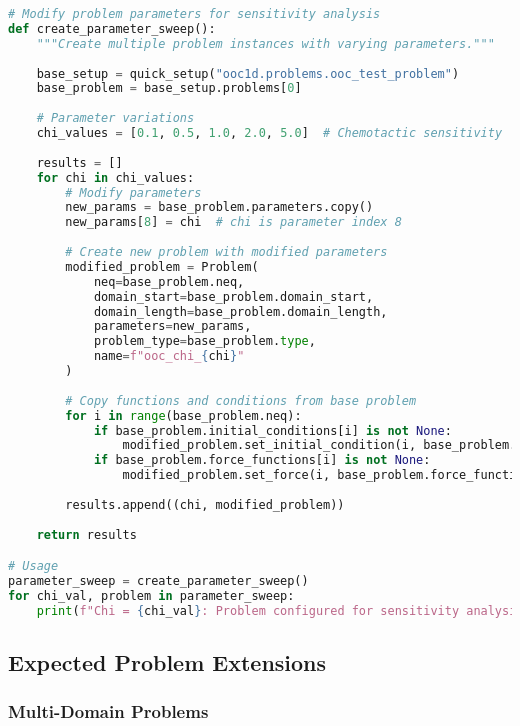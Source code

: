 \begin{lstlisting}[language=Python, caption=Parameter Sensitivity Example]
# Modify problem parameters for sensitivity analysis
def create_parameter_sweep():
    """Create multiple problem instances with varying parameters."""
    
    base_setup = quick_setup("ooc1d.problems.ooc_test_problem")
    base_problem = base_setup.problems[0]
    
    # Parameter variations
    chi_values = [0.1, 0.5, 1.0, 2.0, 5.0]  # Chemotactic sensitivity
    
    results = []
    for chi in chi_values:
        # Modify parameters
        new_params = base_problem.parameters.copy()
        new_params[8] = chi  # chi is parameter index 8
        
        # Create new problem with modified parameters
        modified_problem = Problem(
            neq=base_problem.neq,
            domain_start=base_problem.domain_start,
            domain_length=base_problem.domain_length,
            parameters=new_params,
            problem_type=base_problem.type,
            name=f"ooc_chi_{chi}"
        )
        
        # Copy functions and conditions from base problem
        for i in range(base_problem.neq):
            if base_problem.initial_conditions[i] is not None:
                modified_problem.set_initial_condition(i, base_problem.initial_conditions[i])
            if base_problem.force_functions[i] is not None:
                modified_problem.set_force(i, base_problem.force_functions[i])
        
        results.append((chi, modified_problem))
    
    return results

# Usage
parameter_sweep = create_parameter_sweep()
for chi_val, problem in parameter_sweep:
    print(f"Chi = {chi_val}: Problem configured for sensitivity analysis")
\end{lstlisting}

\subsection{Expected Problem Extensions}
\label{subsec:expected_problem_extensions}

\subsubsection{Multi-Domain Problems}


